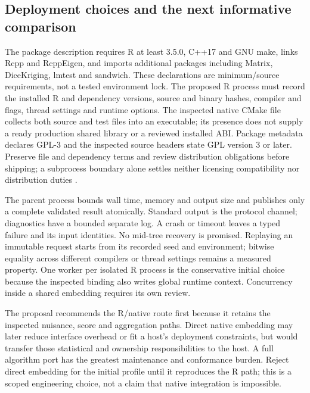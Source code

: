 \subsection{Deployment choices and the next informative comparison}

The package description requires R at least 3.5.0, C++17 and GNU make,
links Rcpp and RcppEigen, and imports additional packages including
Matrix, DiceKriging, lmtest and sandwich. These declarations are
minimum/source requirements, not a tested environment lock. The proposed
R process must record the installed R and dependency versions, source
and binary hashes, compiler and flags, thread settings and runtime
options. The inspected native CMake file collects both source and test
files into an executable; its presence does not supply a ready
production shared library or a reviewed installed ABI. Package metadata
declares GPL-3 and the inspected source headers state GPL version 3 or
later. Preserve file and dependency terms and review distribution
obligations before shipping; a subprocess boundary alone settles neither
licensing compatibility nor distribution duties
\cite{exec13_grf_runtime}.

The parent process bounds wall time, memory and output size and
publishes only a complete validated result atomically. Standard output
is the protocol channel; diagnostics have a bounded separate log. A
crash or timeout leaves a typed failure and its input identities. No
mid-tree recovery is promised. Replaying an immutable request starts
from its recorded seed and environment; bitwise equality across
different compilers or thread settings remains a measured property. One
worker per isolated R process is the conservative initial choice because
the inspected binding also writes global runtime context. Concurrency
inside a shared embedding requires its own review.

The proposal recommends the R/native route first because it retains the
inspected nuisance, score and aggregation paths. Direct native embedding
may later reduce interface overhead or fit a host's deployment
constraints, but would transfer those statistical and ownership
responsibilities to the host. A full algorithm port has the greatest
maintenance and conformance burden. Reject direct embedding for the
initial profile until it reproduces the R path; this is a scoped
engineering choice, not a claim that native integration is impossible.

